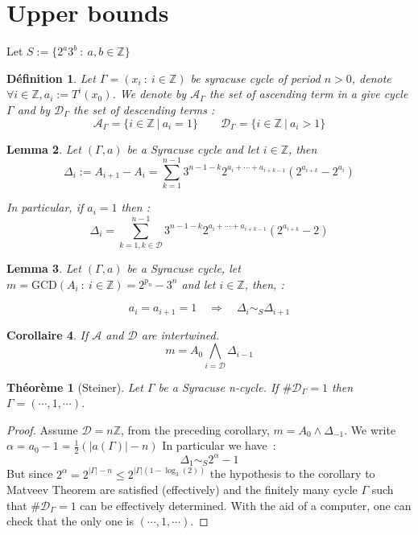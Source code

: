 \documentclass[12pt,a4paper]{article}
\newtheorem{lem}{Lemma}[section]
\newtheorem{cor}[lem]{Corollaire}
\newtheorem{defi}[lem]{Définition}
\newtheorem{theo}{Théorème}
\def\ZZ{\mathbb{Z}}
\def\A{\mathcal{A}}
\def\D{\mathcal{D}}
\begin{document}
\section{Upper bounds}
Let $S := \{2^a3^b ~:~ a,b\in \ZZ\}$
\begin{defi} Let $\Gamma=(x_i~:~ i \in \ZZ)$ be syracuse cycle of period $n>0$, denote $\forall i\in\ZZ , a_i :=T^i(x_0)$.
 We denote by $\mathcal A_\Gamma$ the set of ascending term  in a give cycle $\Gamma$ and by $\mathcal D_\Gamma$ the set of descending terms : 
 $$\A_\Gamma = \{i\in \ZZ~|~ a_i=1\} \quad\quad \D_\Gamma = \{i\in \ZZ~|~ a_i>1\}$$
\end{defi}
\begin{lem}
Let $(\Gamma,a)$ be a Syracuse cycle and let $i\in\ZZ$, then 
$$ \Delta_i := A_{i+1}-A_{i} = \sum_{k=1}^{n-1}3^{n-1-k}2^{a_i+\cdots+a_{i+k-1}} \left(2^{a_{i+k}}-2^{a_i}\right)$$ 

In particular, if $a_i=1$ then :
$$ \Delta_i = \sum_{k=1,k\in\D}^{n-1}3^{n-1-k}2^{a_i+\cdots+a_{i+k-1}} \left(2^{a_{i+k}}-2\right)$$ 
\end{lem}
 
\begin{lem}
Let $(\Gamma,a)$ be a Syracuse cycle, let $m = \mathrm{GCD}(A_i ~:~ i\in \ZZ)=2^{p_n}-3^n$ and let $i\in\ZZ$, then, : 

$$a_i=a_{i+1}=1 \quad\Rightarrow \quad\Delta_{i} \sim_S \Delta_{i+1}$$
\end{lem}

\begin{cor}
If $\A$ and $\D$ are intertwined.
$$ m = A_0\bigwedge_{i=\D}\Delta_{i-1} $$
\end{cor}

\begin{theo}[Steiner] Let $\Gamma$ be a Syracuse n-cycle.
 If $\#\D_\Gamma=1$ then $\Gamma = (\cdots,1,\cdots)$.  
\end{theo}
\begin{proof}
Assume $\D=n\ZZ$, from the preceding corollary,
$m = A_0 \wedge \Delta_{-1}$. We write $\alpha = a_0-1 = \frac{1}{2}(|a(\Gamma)|-n)$
In particular we have~:
$$\Delta_1 \sim_S  2^{\alpha}-1$$
But since $2^\alpha = 2^{|\Gamma|-n}\leq 2^{|\Gamma|(1-\log_3(2))}$ the hypothesis to the corollary to Matveev Theorem are satisfied (effectively) and the finitely many cycle $\Gamma$ such that $\#\D_\Gamma=1$ can be effectively determined. With the aid of a computer, one  can check that the only one is $(\cdots,1,\cdots)$.
\end{proof}
\end{document}
